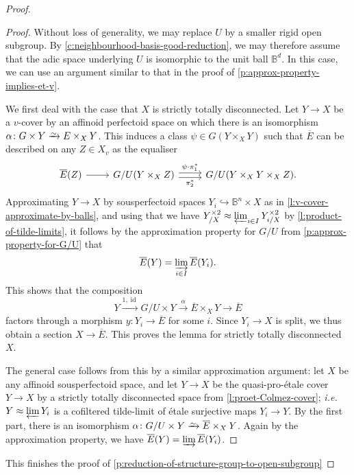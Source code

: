 \documentclass[10pt,a4paper]{article}
\theoremstyle{definition}
\theoremstyle{remark}
\newcommand{\lra}{\longrightarrow}
\newcommand*{\lowsim}{\vbox to 0pt{\vss\hbox{$\scriptstyle\sim$}\vskip-2pt}}
\newcommand*{\isomarrow}{\xrightarrow{\lowsim}}
\newcommand{\B}{\mathbb{B}}
\newcommand{\id}{{\operatorname{id}}}
\numberwithin{equation}{section}
\begin{document}
\begin{proof}
                \begin{proof}
		  Without loss of generality, we may replace $U$ by a smaller rigid open subgroup. By \cref{c:neighbourhood-basis-good-reduction}, we may therefore assume that the adic space underlying $U$ is isomorphic to the unit ball $\B^d$. In this case, we can use an argument similar to that in the proof of \cref{p:approx-property-implies-et-v}.
		  
		We first deal with the case that $X$ is strictly totally disconnected. Let $Y\to X$ be a $v$-cover by an affinoid perfectoid space on which there is an isomorphism $\alpha\colon  G\times Y\isomarrow E\times_XY$. This induces a class $\psi\in G(Y\times_XY)$ such that $\overline{E}$ can be described on any $Z\in X_v$ as the equaliser
		\[\begin{tikzcd}
			\overline{E}(Z)& G/U(Y\times_XZ)&  G/U(Y\times_XY\times_XZ).
			\arrow["\psi\cdot\pi_1^{\ast}", shift left=1, from=1-2, to=1-3]
			\arrow["\pi_2^\ast"', shift right=1, from=1-2, to=1-3]
			\arrow[from=1-1, to=1-2]
		\end{tikzcd}\]
		Approximating $Y\to X$ by sousperfectoid spaces $Y_i\hookrightarrow \B^n\times X$ as in \cref{l:v-cover-approximate-by-balls}, and using that we have $Y_{/X}^{\times 2}\approx \varprojlim_{i\in I} Y_{i/X}^{\times 2}$ by \cref{l:product-of-tilde-limits}, it follows by the approximation property for $G/U$ from \cref{p:approx-property-for-G/U} that 
		\[ \overline{E}(Y)=\varinjlim_{i\in I} \overline{E}(Y_i).\]
		This shows that the composition
		\[ Y\xrightarrow{1,\id}G/U\times Y\overset{\alpha}\lra\overline{E}\times_XY\lra \overline{E}\]
		factors through a morphism $y\colon Y_i\to \overline{E}$ for some $i$. 
		Since $Y_i\to X$ is split, we thus obtain a section $X\to \overline{E}$.
		This proves the lemma for strictly totally disconnected $X$.
		
		The general case follows from this by a similar approximation argument: let $X$ be any affinoid sousperfectoid space, and let $Y\to X$ be the quasi-pro-\'etale cover $Y\to X$ by a strictly totally disconnected space from \cref{l:proet-Colmez-cover}; \textit{i.e.}~$Y\approx \varprojlim Y_i$ is a cofiltered tilde-limit of \'etale surjective maps $Y_i\to Y$. By the first part, there is an isomorphism $\alpha\colon G/U\times Y\isomarrow \overline{E}\times_XY$. Again by the approximation property, we have
		$\overline{E}(Y)=\varinjlim \overline{E}(Y_i)$.
	        \end{proof}
                
	This finishes the proof of \cref{p:reduction-of-structure-group-to-open-subgroup}
\end{proof}
\end{document}
